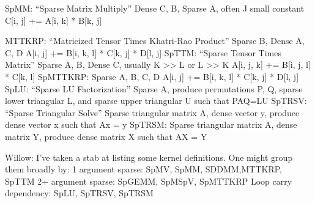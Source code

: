 SpMM:
	“Sparse Matrix Multiply”
Dense C, B, Sparse A, often J small constant
C[i, j] += A[i, k] * B[k, j]

MTTKRP:
	“Matricized Tensor Times Khatri-Rao Product”
Sparse B, Dense A, C, D
A[i, j] += B[i, k, l] * C[k, j] * D[l, j]
SpTTM:
	“Sparse Tensor Times Matrix”
Sparse A, B, Dense C, usually K >> L or L >> K
A[i, j, k] += B[i, j, l] * C[k, l]
SpMTTKRP:
Sparse A, B, C, D
A[i, j] += B[i, k, l] * C[k, j] * D[l, j]
SpLU:
	“Sparse LU Factorization”
Sparse A, produce permutations P, Q, sparse lower triangular L, and sparse upper triangular U
such that PAQ=LU
SpTRSV:
	“Sparse Triangular Solve”
	Sparse triangular matrix A, dense vector y, produce dense vector x such that Ax = y
SpTRSM:
	Sparse triangular matrix A, dense matrix Y, produce dense matrix X such that AX = Y

Willow: I’ve taken a stab at listing some kernel definitions. One might group them broadly by:
	1 argument sparse: SpMV, SpMM, SDDMM,MTTKRP, SpTTM
	2+ argument sparse: SpGEMM, SpMSpV, SpMTTKRP
	Loop carry dependency: SpLU, SpTRSV, SpTRSM

	

